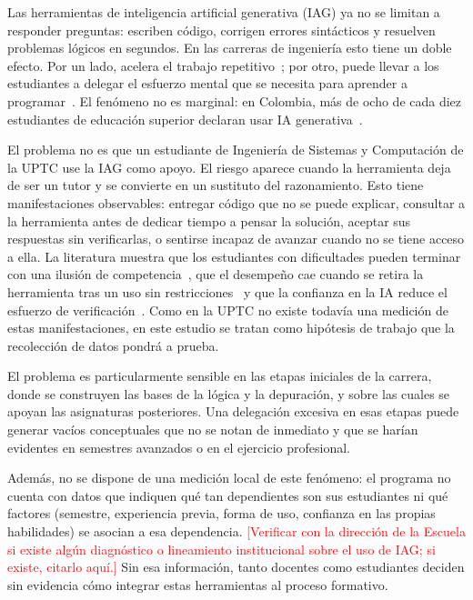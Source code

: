 \documentclass[12pt,letterpaper]{article}
\numberwithin{table}{section}
\numberwithin{figure}{section}
\newcommand{\pendiente}[1]{\textcolor{red}{[#1]}}
\begin{document}
Las herramientas de inteligencia artificial generativa (IAG) ya no se limitan a responder preguntas: escriben código, corrigen errores sintácticos y resuelven problemas lógicos en segundos. En las carreras de ingeniería esto tiene un doble efecto. Por un lado, acelera el trabajo repetitivo~\cite{peng2023impact}; por otro, puede llevar a los estudiantes a delegar el esfuerzo mental que se necesita para aprender a programar~\cite{becker2023programming,prather2024widening}. El fenómeno no es marginal: en Colombia, más de ocho de cada diez estudiantes de educación superior declaran usar IA generativa~\cite{planeta2024inteligencia}.

El problema no es que un estudiante de Ingeniería de Sistemas y Computación de la UPTC use la IAG como apoyo. El riesgo aparece cuando la herramienta deja de ser un tutor y se convierte en un sustituto del razonamiento. Esto tiene manifestaciones observables: entregar código que no se puede explicar, consultar a la herramienta antes de dedicar tiempo a pensar la solución, aceptar sus respuestas sin verificarlas, o sentirse incapaz de avanzar cuando no se tiene acceso a ella. La literatura muestra que los estudiantes con dificultades pueden terminar con una ilusión de competencia~\cite{prather2024widening}, que el desempeño cae cuando se retira la herramienta tras un uso sin restricciones~\cite{bastani2025generative} y que la confianza en la IA reduce el esfuerzo de verificación~\cite{lee2025impact}. Como en la UPTC no existe todavía una medición de estas manifestaciones, en este estudio se tratan como hipótesis de trabajo que la recolección de datos pondrá a prueba.

El problema es particularmente sensible en las etapas iniciales de la carrera, donde se construyen las bases de la lógica y la depuración, y sobre las cuales se apoyan las asignaturas posteriores. Una delegación excesiva en esas etapas puede generar vacíos conceptuales que no se notan de inmediato y que se harían evidentes en semestres avanzados o en el ejercicio profesional.

Además, no se dispone de una medición local de este fenómeno: el programa no cuenta con datos que indiquen qué tan dependientes son sus estudiantes ni qué factores (semestre, experiencia previa, forma de uso, confianza en las propias habilidades) se asocian a esa dependencia. \pendiente{Verificar con la dirección de la Escuela si existe algún diagnóstico o lineamiento institucional sobre el uso de IAG; si existe, citarlo aquí.} Sin esa información, tanto docentes como estudiantes deciden sin evidencia cómo integrar estas herramientas al proceso formativo.
\end{document}
